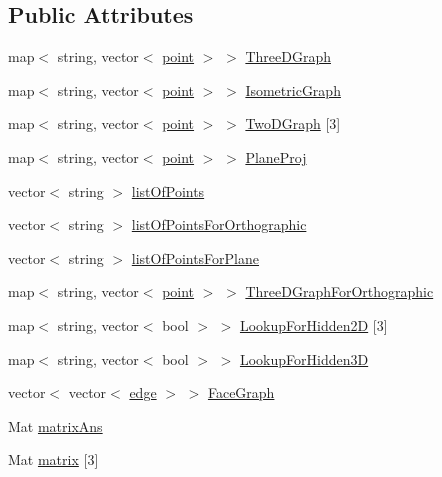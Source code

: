 \subsection*{Public Attributes}
\begin{DoxyCompactItemize}
\item 
map$<$ string, vector$<$ \hyperlink{structpoint}{point} $>$ $>$ \hyperlink{classThreeDGraph__class_a10f2244053d72def3eed9fb4101f0236}{Three\+D\+Graph}
\item 
map$<$ string, vector$<$ \hyperlink{structpoint}{point} $>$ $>$ \hyperlink{classThreeDGraph__class_afa3f00ec2a3864317ad121d087c9896d}{Isometric\+Graph}
\item 
map$<$ string, vector$<$ \hyperlink{structpoint}{point} $>$ $>$ \hyperlink{classThreeDGraph__class_a352d2c3b25256d8a071132dd87606f99}{Two\+D\+Graph} \mbox{[}3\mbox{]}
\item 
map$<$ string, vector$<$ \hyperlink{structpoint}{point} $>$ $>$ \hyperlink{classThreeDGraph__class_ad800b572d58a46cbd5b4139b3ec7b173}{Plane\+Proj}
\item 
vector$<$ string $>$ \hyperlink{classThreeDGraph__class_ab24656328d4be1eae0f6f5742add5969}{list\+Of\+Points}
\item 
vector$<$ string $>$ \hyperlink{classThreeDGraph__class_a9b5605ee14d7774be307a78d00930bd2}{list\+Of\+Points\+For\+Orthographic}
\item 
vector$<$ string $>$ \hyperlink{classThreeDGraph__class_a7a63687d665e48d41867a293d5d8bc16}{list\+Of\+Points\+For\+Plane}
\item 
map$<$ string, vector$<$ \hyperlink{structpoint}{point} $>$ $>$ \hyperlink{classThreeDGraph__class_a8099559641e72dbbd7e29e97f32dc242}{Three\+D\+Graph\+For\+Orthographic}
\item 
map$<$ string, vector$<$ bool $>$ $>$ \hyperlink{classThreeDGraph__class_a8b4c56978bacc0a509d5d69bf79c7125}{Lookup\+For\+Hidden2D} \mbox{[}3\mbox{]}
\item 
map$<$ string, vector$<$ bool $>$ $>$ \hyperlink{classThreeDGraph__class_ac32d99fa519519003b2e4658922afbe0}{Lookup\+For\+Hidden3D}
\item 
vector$<$ vector$<$ \hyperlink{structedge}{edge} $>$ $>$ \hyperlink{classThreeDGraph__class_a36fbc76142278359f5de0df528394944}{Face\+Graph}
\item 
Mat \hyperlink{classThreeDGraph__class_a52564aaa0f2223a754dccb28b347b009}{matrix\+Ans}
\item 
Mat \hyperlink{classThreeDGraph__class_a276acab9cffc9952e64514aad293da84}{matrix} \mbox{[}3\mbox{]}

\end{DoxyCompactItemize}
